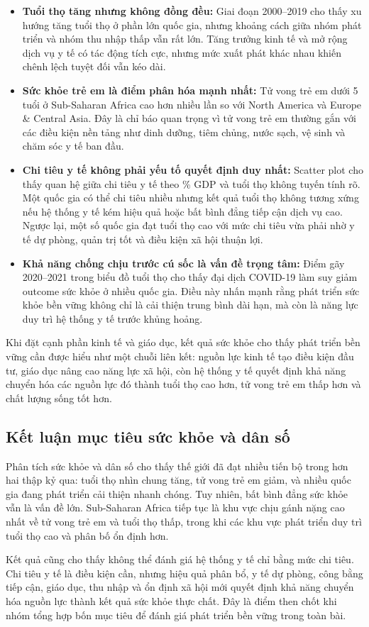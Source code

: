 \begin{itemize}
    \item \textbf{Tuổi thọ tăng nhưng không đồng đều:} Giai đoạn 2000--2019 cho thấy xu hướng tăng tuổi thọ ở phần lớn quốc gia, nhưng khoảng cách giữa nhóm phát triển và nhóm thu nhập thấp vẫn rất lớn. Tăng trưởng kinh tế và mở rộng dịch vụ y tế có tác động tích cực, nhưng mức xuất phát khác nhau khiến chênh lệch tuyệt đối vẫn kéo dài.
    \item \textbf{Sức khỏe trẻ em là điểm phân hóa mạnh nhất:} Tử vong trẻ em dưới 5 tuổi ở Sub-Saharan Africa cao hơn nhiều lần so với North America và Europe \& Central Asia. Đây là chỉ báo quan trọng vì tử vong trẻ em thường gắn với các điều kiện nền tảng như dinh dưỡng, tiêm chủng, nước sạch, vệ sinh và chăm sóc y tế ban đầu.
    \item \textbf{Chi tiêu y tế không phải yếu tố quyết định duy nhất:} Scatter plot cho thấy quan hệ giữa chi tiêu y tế theo \% GDP và tuổi thọ không tuyến tính rõ. Một quốc gia có thể chi tiêu nhiều nhưng kết quả tuổi thọ không tương xứng nếu hệ thống y tế kém hiệu quả hoặc bất bình đẳng tiếp cận dịch vụ cao. Ngược lại, một số quốc gia đạt tuổi thọ cao với mức chi tiêu vừa phải nhờ y tế dự phòng, quản trị tốt và điều kiện xã hội thuận lợi.
    \item \textbf{Khả năng chống chịu trước cú sốc là vấn đề trọng tâm:} Điểm gãy 2020--2021 trong biểu đồ tuổi thọ cho thấy đại dịch COVID-19 làm suy giảm outcome sức khỏe ở nhiều quốc gia. Điều này nhấn mạnh rằng phát triển sức khỏe bền vững không chỉ là cải thiện trung bình dài hạn, mà còn là năng lực duy trì hệ thống y tế trước khủng hoảng.
\end{itemize}

Khi đặt cạnh phần kinh tế và giáo dục, kết quả sức khỏe cho thấy phát triển bền vững cần được hiểu như một chuỗi liên kết: nguồn lực kinh tế tạo điều kiện đầu tư, giáo dục nâng cao năng lực xã hội, còn hệ thống y tế quyết định khả năng chuyển hóa các nguồn lực đó thành tuổi thọ cao hơn, tử vong trẻ em thấp hơn và chất lượng sống tốt hơn.

\subsection{Kết luận mục tiêu sức khỏe và dân số}

Phân tích sức khỏe và dân số cho thấy thế giới đã đạt nhiều tiến bộ trong hơn hai thập kỷ qua: tuổi thọ nhìn chung tăng, tử vong trẻ em giảm, và nhiều quốc gia đang phát triển cải thiện nhanh chóng. Tuy nhiên, bất bình đẳng sức khỏe vẫn là vấn đề lớn. Sub-Saharan Africa tiếp tục là khu vực chịu gánh nặng cao nhất về tử vong trẻ em và tuổi thọ thấp, trong khi các khu vực phát triển duy trì tuổi thọ cao và phân bố ổn định hơn.

Kết quả cũng cho thấy không thể đánh giá hệ thống y tế chỉ bằng mức chi tiêu. Chi tiêu y tế là điều kiện cần, nhưng hiệu quả phân bổ, y tế dự phòng, công bằng tiếp cận, giáo dục, thu nhập và ổn định xã hội mới quyết định khả năng chuyển hóa nguồn lực thành kết quả sức khỏe thực chất. Đây là điểm then chốt khi nhóm tổng hợp bốn mục tiêu để đánh giá phát triển bền vững trong toàn bài.
